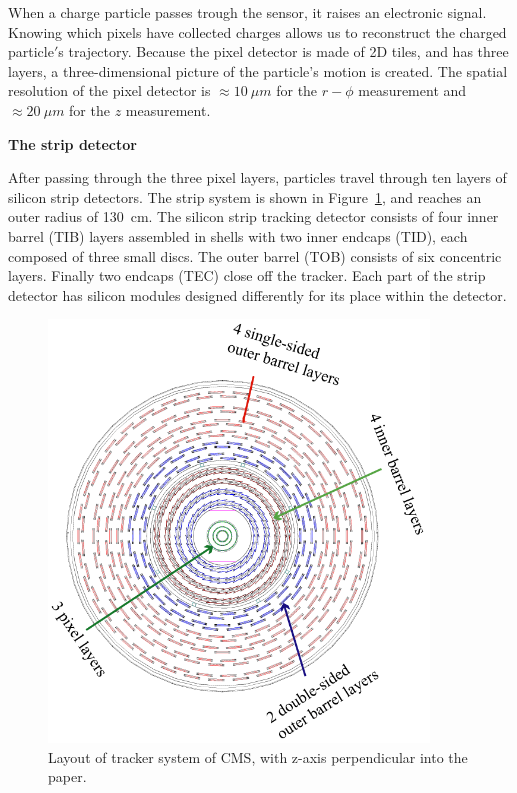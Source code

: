 When a charge particle passes trough the sensor, 
it raises an electronic signal. 
Knowing which pixels have collected charges allows us to reconstruct the charged particle$'$s trajectory. 
Because the pixel detector is made of 2D tiles,  and has three layers,  a three-dimensional picture of the particle's motion is created.
The spatial resolution of the pixel detector is ${\approx}10~ \mu m$ for the $r{-}\phi$ measurement and
${\approx}20~\mu m$ for the $z$ measurement. 





{\bf The strip detector}

After passing through the three pixel layers, particles travel through ten layers of silicon strip detectors. The strip system is shown in Figure~\ref{fig:Strip}, and reaches an outer radius of 130~cm. The silicon strip tracking detector consists of four inner barrel (TIB) layers assembled in shells with two inner endcaps (TID), each composed of three small discs. The outer barrel (TOB) consists of six concentric layers. Finally two endcaps (TEC) close off the tracker. Each part of the strip detector has silicon modules designed differently for its place within the detector.

\begin{figure}[!htbp]
\centering
\includegraphics[width=0.9\textwidth]{figures/Strip.png}
\caption{Layout of tracker system of CMS, with z-axis perpendicular into the paper.}
\label{fig:Strip}
\end{figure}



